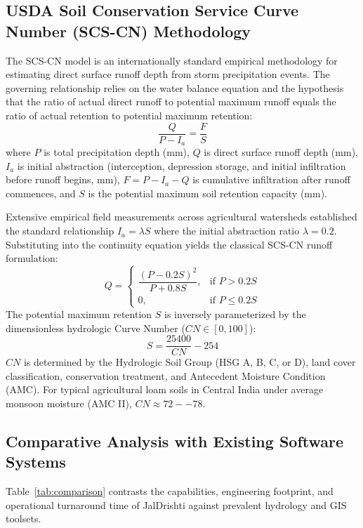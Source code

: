 \documentclass[11pt,a4paper]{article}
\begin{document}
\subsection{USDA Soil Conservation Service Curve Number (SCS-CN) Methodology}
The SCS-CN model is an internationally standard empirical methodology for estimating direct surface runoff depth from storm precipitation events. The governing relationship relies on the water balance equation and the hypothesis that the ratio of actual direct runoff to potential maximum runoff equals the ratio of actual retention to potential maximum retention:
\begin{equation}
\frac{Q}{P - I_a} = \frac{F}{S}
\label{eq:scs_ratio}
\end{equation}
where $P$ is total precipitation depth (mm), $Q$ is direct surface runoff depth (mm), $I_a$ is initial abstraction (interception, depression storage, and initial infiltration before runoff begins, mm), $F = P - I_a - Q$ is cumulative infiltration after runoff commences, and $S$ is the potential maximum soil retention capacity (mm).

Extensive empirical field measurements across agricultural watersheds established the standard relationship $I_a = \lambda S$ where the initial abstraction ratio $\lambda = 0.2$. Substituting into the continuity equation yields the classical SCS-CN runoff formulation:
\begin{equation}
Q = \begin{cases} 
\dfrac{(P - 0.2S)^2}{P + 0.8S}, & \text{if } P > 0.2S \\[8pt]
0, & \text{if } P \le 0.2S
\end{cases}
\label{eq:scs_runoff}
\end{equation}
The potential maximum retention $S$ is inversely parameterized by the dimensionless hydrologic Curve Number ($CN \in [0, 100]$):
\begin{equation}
S = \frac{25400}{CN} - 254
\label{eq:scs_cn}
\end{equation}
$CN$ is determined by the Hydrologic Soil Group (HSG A, B, C, or D), land cover classification, conservation treatment, and Antecedent Moisture Condition (AMC). For typical agricultural loam soils in Central India under average monsoon moisture (AMC II), $CN \approx 72--78$.

\subsection{Comparative Analysis with Existing Software Systems}
Table~\ref{tab:comparison} contrasts the capabilities, engineering footprint, and operational turnaround time of JalDrishti against prevalent hydrology and GIS toolsets.
\end{document}
